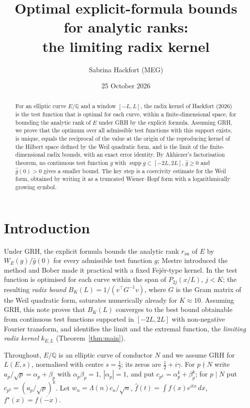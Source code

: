\documentclass[11pt]{amsart}
\title[Optimal explicit-formula bounds for analytic ranks]{Optimal explicit-formula bounds for analytic ranks:\\ the limiting radix kernel}
\author{Sabrina Hackfort (MEG)}
\date{25 October 2026}
\theoremstyle{definition}
\theoremstyle{remark}
\newcommand{\Q}{\mathbb{Q}}
\newcommand{\ran}{r_{\mathrm{an}}}
\DeclareMathOperator{\supp}{supp}
\begin{document}
\begin{abstract}
For an elliptic curve $E/\mathbb{Q}$ and a window $[-L,L]$, the radix kernel of Hackfort (2026) is the test function that
is optimal for each curve, within a finite-dimensional space, for bounding the analytic rank of $E$ under GRH by the
explicit formula. Assuming GRH, we prove that the optimum over all admissible test functions with this support exists, is
unique, equals the reciprocal of the value at the origin of the reproducing kernel of the Hilbert space defined by the Weil
quadratic form, and is the limit of the finite-dimensional radix bounds, with an exact error identity. By Akhiezer's
factorisation theorem, no continuous test function $g$ with $\supp g\subset[-2L,2L]$, $\hat g\ge0$ and $\hat g(0)>0$ gives a
smaller bound. The key step is a coercivity estimate for the Weil form, obtained by writing it as a truncated Wiener--Hopf
form with a logarithmically growing symbol.
\end{abstract}
\maketitle

\section*{Introduction}
Under GRH, the explicit formula bounds the analytic rank $\ran$ of $E$ by $W_E(g)/\hat g(0)$ for every admissible test
function $g$; Mestre \cite{Mestre} introduced the method and Bober \cite{Bober} made it practical with a fixed Fej\'er-type
kernel. In \cite{Hac} the test function is optimised for each curve within the span of $P_{2j}(x/L)$, $j<K$; the resulting
\emph{radix bound} $B_K(L)=1/(v^\top G^{-1}v)$, where $G$ is the Gram matrix of the Weil quadratic form, saturates
numerically already for $K\approx10$. Assuming GRH, this note proves that $B_K(L)$ converges to the best bound obtainable
from continuous test functions supported in $[-2L,2L]$ with non-negative Fourier transform, and identifies the limit and
the extremal function, the \emph{limiting radix kernel} $k_{E,L}$ (Theorem~\ref{thm:main}).


\noindent Throughout, $E/\Q$ is an elliptic curve of conductor $N$ and we assume GRH for $L(E,s)$, normalised with
centre $s=\tfrac12$; its zeros are $\tfrac12+i\gamma$. For $p\nmid N$ write $a_p/\sqrt p=\alpha_p+\beta_p$ with
$\alpha_p\beta_p=1$, $|\alpha_p|=1$, and put $c_{p^k}=\alpha_p^k+\beta_p^k$; for $p\mid N$ put $c_{p^k}=(a_p/\sqrt p)^k$.
Let $w_n=\Lambda(n)c_n/\sqrt n$, $\hat f(t)=\int f(x)e^{itx}\,dx$, $f^\star(x)=\overline{f(-x)}$.
\end{document}

